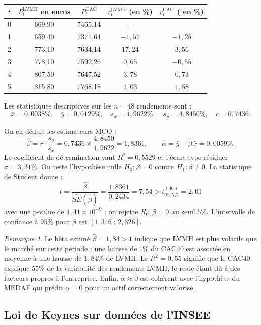 \documentclass[12pt,a4paper]{article}
\theoremstyle{definition}
\theoremstyle{remark}
\newtheorem{remarque}[theoreme]{Remarque}
\begin{document}
\begin{center}
\begin{tabular}{ccccc}
\toprule
$t$ & $P_t^{\text{LVMH}}$ en euros & $P_t^{\text{CAC}}$ & 
$r_t^{\text{LVMH}}$ (en \%) & $r_t^{\text{CAC}}$ ( en \%) \\
\midrule
0 & 669,90 & 7465,14 & — & — \\
1 & 659,40 & 7371,64 & $-1{,}57$ & $-1{,}25$ \\
2 & 773,10 & 7634,14 & $17{,}24$ & $3{,}56$ \\
3 & 778,10 & 7592,26 & $0{,}65$ & $-0{,}55$ \\
4 & 807,50 & 7647,52 & $3{,}78$ & $0{,}73$ \\
5 & 815,80 & 7768,18 & $1{,}03$ & $1{,}58$ \\
\bottomrule
\end{tabular}
\end{center}

Les statistiques descriptives sur les $n = 48$ rendements sont :
\[
\bar{x} = 0,0038\%, \quad \bar{y} = 0,0129\%, \quad
s_x = 1,9622\%, \quad s_y = 4,8450\%, \quad r = 0,7436.
\]

On en déduit les estimateurs MCO :
\[
\hat{\beta} = r \cdot \frac{s_y}{s_x} = 0,7436 \times \frac{4,8450}{1,9622} = 1,8361,
\qquad
\hat{\alpha} = \bar{y} - \hat{\beta}\,\bar{x} = 0,0059\%.
\]
Le coefficient de détermination vaut $R^2 = 0,5529$ et l'écart-type résiduel
$\hat{\sigma} = 3,31\%$. On teste l'hypothèse nulle $H_0 : \beta = 0$  contre $H_1 : \beta \neq 0$. La statistique 
de Student donne :
\[
    t = \frac{\hat{\beta}}{\widehat{SE}(\hat{\beta})} =
    \frac{1,8361}{0,2434} = 7,54 > t_{97,5\%}^{(46)} = 2,01
\]
avec une p-value de $1,41 \times 10^{-9}$ : on rejette $H_0 : \beta = 0$
au seuil $5\%$. L'intervalle de confiance à $95\%$ pour $\beta$ est
$[1,346\ ;\ 2,326]$.

\begin{remarque}
Le bêta estimé $\hat{\beta} = 1{,}84 > 1$ indique que LVMH est plus
volatile que le marché sur cette période : une hausse de $1\%$ du CAC40
est associée en moyenne à une hausse de $1,84\%$ de LVMH. Le $R^2 = 0{,}55$
signifie que le CAC40 explique $55\%$ de la variabilité des rendements LVMH,
le reste étant dû à des facteurs propres à l'entreprise. Enfin,
$\hat{\alpha} \approx 0$ est cohérent avec l'hypothèse du MEDAF qui prédit
$\alpha = 0$ pour un actif correctement valorisé.
\end{remarque}

\subsection{Loi de Keynes sur données de l'INSEE}
\end{document}
